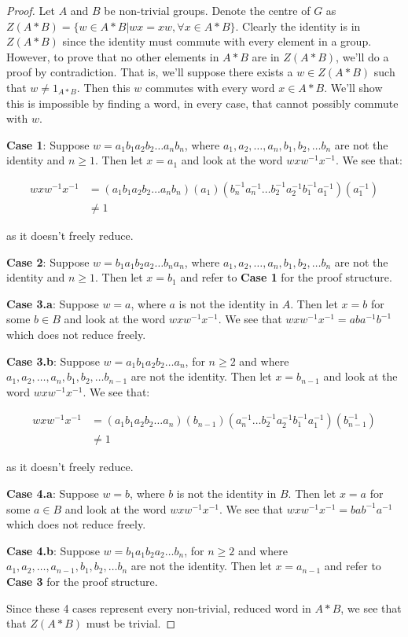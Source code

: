 \documentclass[12pt]{article}%
\begin{document}
\begin{proof}
Let $A$ and $B$ be non-trivial groups. Denote the centre of $G$ as
$Z(A*B)=\{ w \in A*B | wx=xw, \forall x \in A*B \}$. Clearly the identity is in $Z(A*B)$ since the
identity must commute with every element in a group. However, to prove that no other elements in $A*B$ are
in $Z(A*B)$, we'll do a proof by contradiction. That is, we'll suppose there exists a $w\in Z(A*B)$ such
that $w \neq 1_{A*B}$. Then this $w$ commutes with every word $x \in A*B$. We'll show this is impossible
by finding a word, in every case, that cannot possibly commute with $w$.

\textbf{Case 1}: Suppose $w=a_{1}b_{1}a_{2}b_{2}\ldots a_{n}b_{n}$, where
$a_1,a_2,\ldots ,a_n, b_1,b_2,\ldots b_n$ are not the identity and $n\geq 1$. Then let $x=a_1$ and look
at the word $wxw^{-1}x^{-1}$. We see that:

\begin{align*}
  wxw^{-1}x^{-1} &= (a_{1}b_{1}a_{2}b_{2}\ldots a_{n}b_{n}) (a_{1}) (b_{n}^{-1}a_{n}^{-1}\ldots b_{2}^{-1}a_{2}^{-1}b_{1}^{-1}a_{1}^{-1}) (a_{1}^{-1}) \\
  &\neq 1
\end{align*}

as it doesn't freely reduce.

\textbf{Case 2}: Suppose $w=b_{1}a_{1}b_{2}a_{2}\ldots b_{n}a_{n}$, where
$a_1,a_2,\ldots ,a_n, b_1,b_2,\ldots b_n$ are not the identity and $n\geq 1$. Then let $x=b_1$ and refer
to \textbf{Case 1} for the proof structure. 

\textbf{Case 3.a}:
Suppose $w=a$, where $a$ is not the identity in $A$. Then let $x=b$ for some $b\in B$ and look at the word
$wxw^{-1}x^{-1}$. We see that $wxw^{-1}x^{-1}=aba^{-1}b^{-1}$ which does not reduce freely.

\textbf{Case 3.b}: 
Suppose $w=a_{1}b_{1}a_{2}b_{2}\ldots a_{n}$, for $n\geq 2$ and where $a_1,a_2,\ldots ,a_n, b_1,b_2,\ldots b_{n-1}$ are not the identity. Then let $x=b_{n-1}$ and look at the word $wxw^{-1}x^{-1}$. We see that:

\begin{align*}
  wxw^{-1}x^{-1} &= (a_{1}b_{1}a_{2}b_{2}\ldots a_{n}) (b_{n-1}) (a_{n}^{-1}\ldots b_{2}^{-1}a_{2}^{-1}b_{1}^{-1}a_{1}^{-1}) (b_{n-1}^{-1}) \\
  &\neq 1
\end{align*}

as it doesn't freely reduce.

\textbf{Case 4.a}:
Suppose $w=b$, where $b$ is not the identity in $B$. Then let $x=a$ for some $a\in B$ and look at the word
$wxw^{-1}x^{-1}$. We see that $wxw^{-1}x^{-1}=bab^{-1}a^{-1}$ which does not reduce freely.

\textbf{Case 4.b}: Suppose $w=b_{1}a_{1}b_{2}a_{2}\ldots b_{n}$, for $n\geq 2$ and where
$a_1,a_2,\ldots ,a_{n-1}, b_1,b_2,\ldots b_n$ are not the identity. Then let $x=a_{n-1}$ and refer to
\textbf{Case 3} for the proof structure. 

Since these 4 cases represent every non-trivial, reduced word in $A*B$, we see that that $Z(A*B)$ must
be trivial.
\end{proof}
\end{document}
